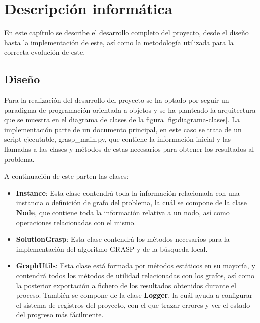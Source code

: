 
\chapter{Descripción informática} %

\label{Chapter4} %


En este capítulo se describe el desarrollo completo del proyecto, desde el diseño hasta la implementación de este, así como la metodología utilizada para la correcta evolución de este.

\section{Diseño}
Para la realización del desarrollo del proyecto se ha optado por seguir un paradigma de programación orientada a objetos y se ha planteado la arquitectura que se muestra en el diagrama de clases de la figura \ref{fig:diagrama-clases}.
La implementación parte de un documento principal, en este caso se trata de un script ejecutable, grasp\_main.py, que contiene la información inicial y las llamadas a las clases y métodos de estas necesarios para obtener los resultados al problema.

A continuación de este parten las clases:
 \begin{itemize}
	\item \textbf{Instance}: Esta clase contendrá toda la información relacionada con una instancia o definición de grafo del problema, la cuál se compone de la clase \textbf{Node}, que contiene toda la información relativa a un nodo, así como operaciones relacionadas con el mismo.
	\item \textbf{SolutionGrasp}: Esta clase contendrá los métodos necesarios para la implementación del algoritmo \gls{GRASP} y de la búsqueda local.
	\item \textbf{GraphUtils}: Esta clase está formada por métodos estáticos en su mayoría, y contendrá todos los métodos de utilidad relacionadas con los grafos, así como la posterior exportación a fichero de los resultados obtenidos durante el proceso. También se compone de la clase \textbf{Logger}, la cuál ayuda a configurar el sistema de registros del proyecto, con el que trazar errores y ver el estado del progreso más fácilmente.
\end{itemize}

